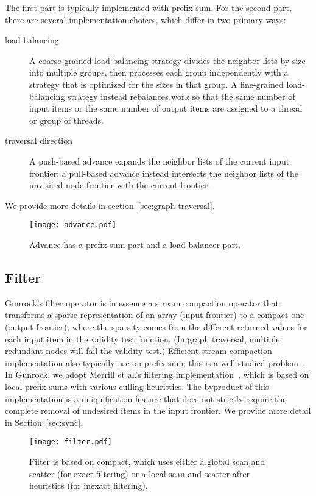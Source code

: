 \documentclass[format=acmsmall,review=false,screen=true]{acmart}
\begin{document}
The first part is typically implemented with prefix-sum. For the
second part, there are several implementation choices, which differ in
two primary ways:
\begin{description}
\item[load balancing] A coarse-grained load-balancing strategy divides
  the neighbor lists by size into multiple groups, then processes each
  group independently with a strategy that is optimized for the sizes
  in that group. A fine-grained load-balancing strategy instead
  rebalances work so that the same number of input items or the same
  number of output items are assigned to a thread or group of threads.
\item[traversal direction] A push-based advance expands the neighbor
  lists of the current input frontier; a pull-based advance instead
  intersects the neighbor lists of the unvisited node frontier with
  the current frontier.
\end{description}
We provide more details in section~\ref{sec:graph-traversal}.

\begin{figure}
  \centering
  \texttt{[image: advance.pdf]}
  \centering
  \caption[Workflow of advance operator.]{Advance has a prefix-sum
    part and a load balancer part.}
  \label{fig:advance}
\end{figure}

\subsection{Filter}
Gunrock's filter operator is in essence a stream compaction operator
that transforms a sparse representation of an array (input frontier)
to a compact one (output frontier), where the sparsity comes from the
different returned values for each input item in the validity test
function. (In graph traversal, multiple redundant nodes will fail the
validity test.) Efficient stream compaction implementation also
typically use on prefix-sum; this is a well-studied
problem~\cite{Billeter:2009:ESC,Harris:2016:CUDPP}. In Gunrock, we
adopt Merrill et al.'s filtering
implementation~\cite{Merrill:2012:SGG}, which is based on local
prefix-sums with various culling heuristics. The byproduct of this
implementation is a uniquification feature that does not strictly
require the complete removal of undesired items in the input frontier.
We provide more detail in Section~\ref{sec:sync}.

\begin{figure}
  \centering
  \texttt{[image: filter.pdf]}
  \centering
  \caption[Workflow of filter operator.]{Filter is based on compact,
    which uses either a global scan and scatter (for exact filtering)
    or a local scan and scatter after heuristics (for inexact
    filtering).}
  \label{fig:filter}
\end{figure}
\end{document}

